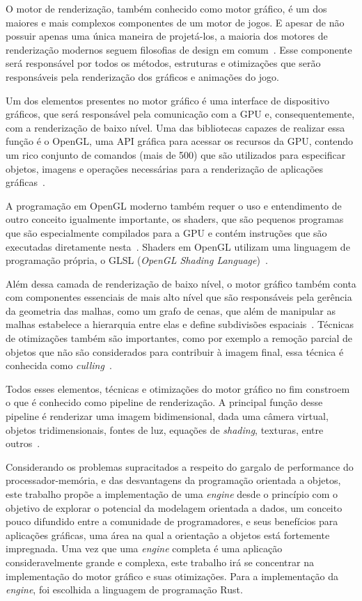 \documentclass[11pt]{article}
\begin{document}
O motor de renderização, também conhecido como motor gráfico, é um dos maiores e mais complexos componentes de um motor de 
jogos. E apesar de não possuir apenas uma única maneira de projetá-los, a maioria dos motores de renderização modernos 
seguem filosofias de design em comum~\cite{gregory2009game}. Esse componente será responsável por todos os métodos, 
estruturas e otimizações que serão responsáveis pela renderização dos gráficos e animações do jogo. 

Um dos elementos 
presentes no motor gráfico é uma interface de dispositivo gráficos, que será responsável pela comunicação com a GPU 
e, consequentemente, com a renderização de baixo nível. Uma das bibliotecas capazes de realizar essa função é o OpenGL, uma 
API gráfica para acessar os recursos da GPU, contendo um rico conjunto de comandos (mais de 500) que são utilizados para 
especificar objetos, imagens e operações necessárias para a renderização de aplicações gráficas~\cite{shreiner2013opengl}.

A programação em OpenGL moderno também requer o uso e entendimento de outro conceito igualmente importante, os shaders, que 
são pequenos programas que são especialmente compilados para a GPU e contém instruções que são executadas diretamente 
nesta~\cite{shreiner2013opengl}. Shaders em OpenGL utilizam uma linguagem de programação própria, o GLSL (\textit{OpenGL 
Shading Language})~\cite{shreiner2013opengl}.

Além dessa camada de renderização de baixo nível, o motor gráfico também conta com componentes essenciais de mais alto nível 
que são responsáveis pela gerência da geometria das malhas, como um grafo de cenas, que além de manipular as malhas estabelece 
a hierarquia entre elas e define subdivisões espaciais~\cite{gregory2009game}. Técnicas de otimizações também são importantes, 
como por exemplo a remoção parcial de objetos que não são considerados para contribuir à imagem final, essa técnica é 
conhecida como \textit{culling}~\cite{akenine2008real}.

Todos esses elementos, técnicas e otimizações do motor gráfico no fim constroem o que é conhecido como pipeline de 
renderização. A principal função desse pipeline é renderizar uma imagem bidimensional, 
dada uma câmera virtual, objetos tridimensionais, fontes de luz, equações de \textit{shading}, texturas, entre 
outros~\cite{akenine2008real}.

Considerando os problemas supracitados a respeito do gargalo de performance do processador-memória, e das desvantagens da 
programação orientada a objetos, este trabalho propõe a implementação de uma \textit{engine} desde o princípio com o objetivo de 
explorar o potencial da modelagem orientada a dados, um conceito pouco difundido entre a comunidade de programadores, 
e seus benefícios para aplicações gráficas, uma área na qual a orientação a objetos está fortemente impregnada. Uma vez
que uma \textit{engine} completa é uma aplicação consideravelmente grande e complexa, este trabalho irá se concentrar na implementação
do motor gráfico e suas otimizações. Para a implementação da \textit{engine}, foi escolhida a linguagem de programação Rust.
\end{document}
